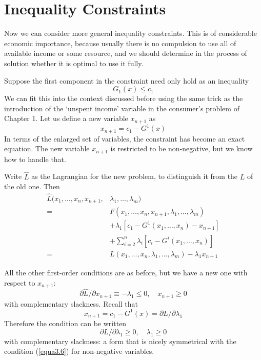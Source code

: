 \section*{Inequality Constraints}

Now we can consider more general inequality constraints. This is of considerable economic importance, because usually there is no compulsion to use all of available income or some resource, and we should determine in the process of solution whether it is optimal to use it fully.

Suppose the first component in the constraint need only hold as an inequality
\begin{equation*}
G_1(x) \leq c_1
\end{equation*}
We can fit this into the context discussed before using the same trick as the introduction of the `unspent income' variable in the consumer's problem of Chapter 1. Let us define a new variable $x_{n+1}$ as
\begin{equation} \label{equa3.8}
 x_{n+1} = c_1 - G^1(x)
\end{equation}
In terms of the enlarged set of variables, the constraint has become an exact equation. The new variable $x_{n+1}$ is restricted to be non-negative, but we know how to handle that.

Write $\hat{L}$ as the Lagrangian for the new problem, to distinguish it from the $L$ of the old one. Then
\begin{equation*}
\begin{array}{rl}
\hat{L}( x_1, \dots, x_n, x_{n+1}, & \lambda_1,\dots,\lambda_m ) \\
                                = & F(x_1, \dots ,x_n, x_{n+1}, \lambda_1,\dots, \lambda_m)  \\
                        & + \lambda_1[c_1 - G^1(x_1, \dots, x_n) - x_{n+1} ] \\
                    & + \sum_{i=2}^n \lambda_i [c_i - G^i(x_1, \dots, x_n) ] \\
                   = & L(x_1, \dots, x_n, \lambda_1, \dots, \lambda_m) - \lambda_1 x_{n+1}
\end{array}
\end{equation*}

All the other first-order conditions are as before, but we have a new one with respect to $x_{n+1}$:
\begin{equation*}
\partial \hat{L} / \partial x_{n+1} \equiv - \lambda_1 \leq 0, \quad x_{n+1} \geq 0
\end{equation*}
with complementary slackness. Recall that
\begin{equation*}
x_{n+1} = c_1 - G^1(x) = \partial L/ \partial \lambda_1
\end{equation*}
Therefore the condition can be written
\begin{equation} \label{equa3.9}
\partial L / \partial \lambda_1 \geq 0, \quad \lambda_1 \geq 0
\end{equation}
with complementary slackness: a form that is nicely symmetrical with the condition (\ref{equa3.6}) for non-negative variables.

